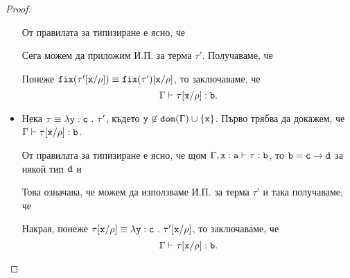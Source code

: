 \begin{proof}
\begin{itemize}
    От правилата за типизиране е ясно, че
    \begin{prooftree}
    \end{prooftree}
    Сега можем да приложим И.П. за терма $\tau'$. Получаваме, че
    \begin{prooftree}
    \end{prooftree}
    Понеже $\fix(\tau'\subst{x}{\rho}) \equiv \fix(\tau')\subst{x}{\rho}$, то заключаваме, че
    \[\Gamma \vdash \tau[\vv{x}/\rho] : \vv{b}.\]
  \item

    Нека $\tau \equiv \lamb{y}{c}{\tau'}$, където $\vv{y} \not\in \vv{dom}(\Gamma) \cup \{\vv{x}\}$.
    Първо трябва да докажем, че $\Gamma \vdash \tau[\vv{x}/\rho] : \vv{b}$.
    
    От правилата за типизиране е ясно, че щом $\Gamma, \type{x}{a} \vdash \tau : \vv{b}$, то
    $\vv{b} = \vv{c} \to \vv{d}$ за някой тип $\vv{d}$ и
    \begin{prooftree}
    \end{prooftree}
    Това означава, че можем да използваме И.П. за терма $\tau'$ и така получаваме, че
    \begin{prooftree}
    \end{prooftree}
    Накрая, понеже $\tau\subst{x}{\rho} \equiv \lamb{y}{c}{\tau'\subst{x}{\rho}}$, то
    заключаваме, че
    \[\Gamma \vdash \tau\subst{x}{\rho}:\vv{b}.\]


\end{itemize}
\end{proof}
